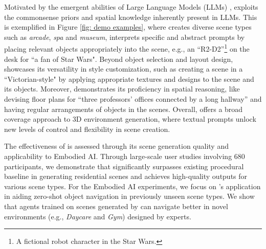 
Motivated by the emergent abilities of Large Language Models (LLMs) \cite{wei2022emergent}, \holodeck exploits the commonsense priors and spatial knowledge inherently present in LLMs. This is exemplified in Figure \ref{fig: demo examples}, where \holodeck creates diverse scene types such as \textit{arcade}, \textit{spa} and \textit{museum}, interprets specific and abstract prompts by placing relevant objects appropriately into the scene, e.g., an ``R2-D2''\footnote{A fictional robot character in the Star Wars.} on the desk for ``a fan of Star Wars". Beyond object selection and layout design, \holodeck showcases its versatility in style customization, such as creating a scene in a ``Victorian-style" by applying appropriate textures and designs to the scene and its objects. Moreover, \holodeck demonstrates its proficiency in spatial reasoning, like devising floor plans for ``three professors' offices connected by a long hallway'' and having regular arrangements of objects in the scenes.
Overall, \holodeck offers a broad coverage approach to 3D environment generation, where textual prompts unlock new levels of control and flexibility in scene creation.

The effectiveness of \holodeck is assessed through its scene generation quality and applicability to Embodied AI. Through large-scale user studies involving 680 participants, we demonstrate that \holodeck significantly surpasses existing procedural baseline \procthor \cite{procthor} in generating residential scenes and achieves high-quality outputs for various scene types. For the Embodied AI experiments, we focus on \holodeck's application in aiding zero-shot object navigation in previously unseen scene types. %
We show that agents trained on scenes generated by \holodeck can navigate better in novel environments (e.g., \textit{Daycare} and \textit{Gym}) designed by experts.


